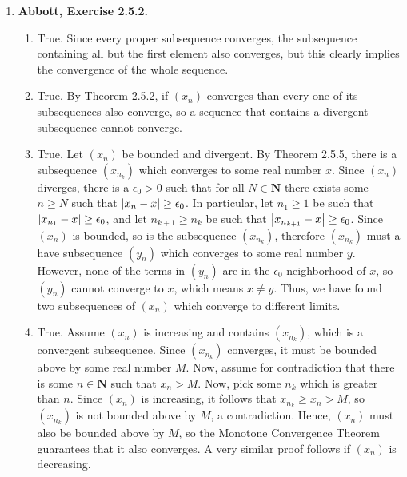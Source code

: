 \documentclass{article}
\DeclarePairedDelimiter\abs{\lvert}{\rvert}
\newcommand{\N}{\mathbf{N}}
\newcommand{\exc}[2][Abbott]{\item \textbf{#1, Exercise #2.}}
\begin{document}
\begin{enumerate}
    \exc{2.5.2}
    \begin{enumerate}
        \item True. Since every proper subsequence converges, the subsequence containing all but the first element also converges, but this clearly implies the convergence of the whole sequence.
        
        \item True. By Theorem 2.5.2, if $(x_n)$ converges than every one of its subsequences also converge, so a sequence that contains a divergent subsequence cannot converge.
        
        \item True. Let $(x_n)$ be bounded and divergent. By Theorem 2.5.5, there is a subsequence $(x_{n_k})$ which converges to some real number $x$. Since $(x_n)$ diverges, there is a $\epsilon_0 > 0$ such that for all $N \in \N$ there exists some $n \geq N$ such that $\abs*{x_n-x} \geq \epsilon_0$. In particular, let $n_1 \geq 1$ be such that $\abs*{x_{n_1}-x} \geq \epsilon_0$, and let $n_{k+1} \geq n_k$ be such that $\abs*{x_{n_{k+1}} - x} \geq \epsilon_0$. Since $(x_n)$ is bounded, so is the subsequence $(x_{n_k})$, therefore $(x_{n_k})$ must a have subsequence $(y_n)$ which converges to some real number $y$. However, none of the terms in $(y_n)$ are in the $\epsilon_0$-neighborhood of $x$, so $(y_n)$ cannot converge to $x$, which means $x \neq y$. Thus, we have found two subsequences of $(x_n)$ which converge to different limits.
        
        \item True. Assume $(x_n)$ is increasing and contains $(x_{n_k})$, which is a convergent subsequence. Since $(x_{n_k})$ converges, it must be bounded above by some real number $M$. Now, assume for contradiction that there is some $n \in \N$ such that $x_n > M$. Now, pick some $n_k$ which is greater than $n$. Since $(x_n)$ is increasing, it follows that $x_{n_k} \geq x_n > M$, so $(x_{n_k})$ is not bounded above by $M$, a contradiction. Hence, $(x_n)$ must also be bounded above by $M$, so the Monotone Convergence Theorem guarantees that it also converges. A very similar proof follows if $(x_n)$ is decreasing.
    \end{enumerate}
    

\end{enumerate}
\end{document}
